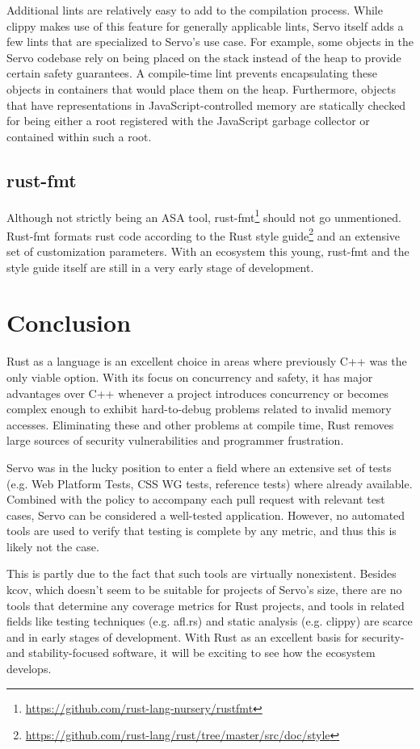 \documentclass{scrartcl}
\begin{document}
Additional lints are relatively easy to add to the compilation process. While clippy makes use of this feature for generally applicable lints, Servo itself adds a few lints that are specialized to Servo's use case. For example, some objects in the Servo codebase rely on being placed on the stack instead of the heap to provide certain safety guarantees. A compile-time lint prevents encapsulating these objects in containers that would place them on the heap. Furthermore, objects that have representations in JavaScript-controlled memory are statically checked for being either a root registered with the JavaScript garbage collector or contained within such a root.


\subsection{rust-fmt}

Although not strictly being an ASA tool, rust-fmt\footnote{\url{https://github.com/rust-lang-nursery/rustfmt}} should not go unmentioned. Rust-fmt formats rust code according to the Rust style guide\footnote{\url{https://github.com/rust-lang/rust/tree/master/src/doc/style}} and an extensive set of customization parameters. With an ecosystem this young, rust-fmt and the style guide itself are still in a very early stage of development.



\newpage

\section{Conclusion}

Rust as a language is an excellent choice in areas where previously C++ was the only viable option. With its focus on concurrency and safety, it has major advantages over C++ whenever a project introduces concurrency or becomes complex enough to exhibit hard-to-debug problems related to invalid memory accesses. Eliminating these and other problems at compile time, Rust removes large sources of security vulnerabilities and programmer frustration.

Servo was in the lucky position to enter a field where an extensive set of tests (e.g. Web Platform Tests, CSS WG tests, reference tests) where already available. Combined with the policy to accompany each pull request with relevant test cases, Servo can be considered a well-tested application. However, no automated tools are used to verify that testing is complete by any metric, and thus this is likely not the case.

This is partly due to the fact that such tools are virtually nonexistent. Besides kcov, which doesn't seem to be suitable for projects of Servo's size, there are no tools that determine any coverage metrics for Rust projects, and tools in related fields like testing techniques (e.g. afl.rs) and static analysis (e.g. clippy) are scarce and in early stages of development. With Rust as an excellent basis for security- and stability-focused software, it will be exciting to see how the ecosystem develops.
\end{document}
